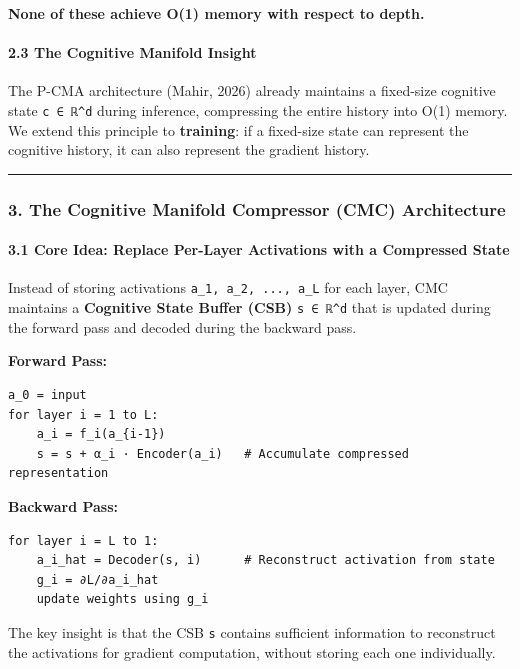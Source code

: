 \documentclass[
  11pt,
  a4paper,
]{article}
\begin{document}
\textbf{None of these achieve O(1) memory with respect to depth.}

\paragraph{2.3 The Cognitive Manifold
Insight}\label{the-cognitive-manifold-insight}

The P-CMA architecture (Mahir, 2026) already maintains a fixed-size
cognitive state \texttt{c\ ∈\ ℝ\^{}d} during inference, compressing the
entire history into O(1) memory. We extend this principle to
\textbf{training}: if a fixed-size state can represent the cognitive
history, it can also represent the gradient history.

\begin{center}\rule{0.5\linewidth}{0.5pt}\end{center}

\subsubsection{3. The Cognitive Manifold Compressor (CMC)
Architecture}\label{the-cognitive-manifold-compressor-cmc-architecture}

\paragraph{3.1 Core Idea: Replace Per-Layer Activations with a
Compressed
State}\label{core-idea-replace-per-layer-activations-with-a-compressed-state}

Instead of storing activations \texttt{a\_1,\ a\_2,\ ...,\ a\_L} for
each layer, CMC maintains a \textbf{Cognitive State Buffer (CSB)}
\texttt{s\ ∈\ ℝ\^{}d} that is updated during the forward pass and
decoded during the backward pass.

\textbf{Forward Pass:}

\begin{verbatim}
a_0 = input
for layer i = 1 to L:
    a_i = f_i(a_{i-1})
    s = s + α_i · Encoder(a_i)   # Accumulate compressed representation
\end{verbatim}

\textbf{Backward Pass:}

\begin{verbatim}
for layer i = L to 1:
    a_i_hat = Decoder(s, i)      # Reconstruct activation from state
    g_i = ∂L/∂a_i_hat
    update weights using g_i
\end{verbatim}

The key insight is that the CSB \texttt{s} contains sufficient
information to reconstruct the activations for gradient computation,
without storing each one individually.
\end{document}
